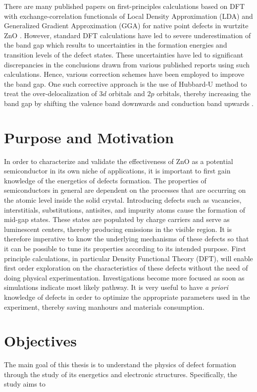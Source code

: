 There are many published papers on first-principles  calculations based on DFT with exchange-correlation functionals of Local Density Approximation (LDA) and Generalized Gradient Approximation (GGA) for native point defects in wurtzite ZnO \citep{Kohan2000,Walle2001,Zhang2001,Oba2001,Lee2001,Erhart2005,Erhart2006,Lany2007}. However, standard DFT calculations have led to severe underestimation of the  band gap which results to uncertainties in the formation energies and transition levels of the defect states.  These uncertainties have led to significant discrepancies in the conclusions drawn from various published reports using such calculations. Hence, various correction schemes have been employed to improve the band gap. One such corrective approach is the use of Hubbard-U method  to treat the over-delocalization of $3d$  orbitals and $2p$  orbitals,  thereby increasing the band gap by shifting the valence band downwards and conduction band upwards \citep{Qiao2014,Yaakob2014,Parhizgar2018,Harun2020}.

\section{Purpose and Motivation}
In order to characterize and validate the effectiveness of ZnO as a potential semiconductor in its own niche of applications, it is important to first gain knowledge of the energetics of  defects formation. The properties of semiconductors in general are dependent on the processes that are occurring on the atomic level inside the solid crystal. Introducing defects such as vacancies, interstitials, substitutions, antisites, and impurity atoms cause the formation of mid-gap states. These states are populated by charge carriers and serve as luminescent centers, thereby producing emissions in the visible region. It is therefore imperative to know the underlying mechanisms of these defects so that it can be possible to tune its properties according to its intended purpose. First principle calculations, in particular Density Functional Theory (DFT), will enable first order exploration on the characteristics of these defects without the need of doing physical experimentation. Investigations become more focused as soon as simulations indicate most likely pathway. It is very useful to have \emph{a priori} knowledge of defects in order to optimize the appropriate parameters used in the experiment, thereby saving  manhours and materials consumption.

\section{Objectives}
The main goal of this thesis is to understand the physics  of defect formation through the study of its energetics and electronic structures. Specifically, the study aims to

